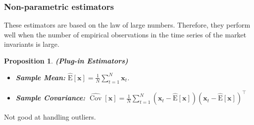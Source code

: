 \documentclass[13pt]{article}
\newtheorem{proposition}[theorem]{Proposition}
\theoremstyle{definition}
\theoremstyle{remark}
\newenvironment{remark}
  {\pushQED{\qed}\renewcommand{\qedsymbol}{$\triangle$}\remarkx}
  {\popQED\endremarkx}
\begin{document}
\subsubsection{Non-parametric estimators}
These estimators are based on the law of large numbers. Therefore, they perform well when the number of empirical observations in the time series of the market invariants is large.
\begin{proposition}
    \textbf{(Plug-in Estimators)}\begin{itemize}
    \item \textbf{Sample Mean:} $\widehat{\mathrm{E}}\left[\mathbf{x}\right] =\frac{1}{N} \sum_{t=1}^N \mathbf{x}_t$.
    \item \textbf{Sample Covariance:} $\widehat{\operatorname{Cov}}\left[\mathbf{x}\right]=\frac{1}{N} \sum_{t=1}^N\left(\mathbf{x}_t-\widehat{\mathrm{E}}\left[\mathbf{x}\right]\right)\left(\mathbf{x}_t-\widehat{\mathrm{E}}\left[\mathbf{x}\right]\right)^{\top}$
\end{itemize}
\end{proposition}
\begin{remark}
    Not good at handling outliers.
\end{remark}
\end{document}
